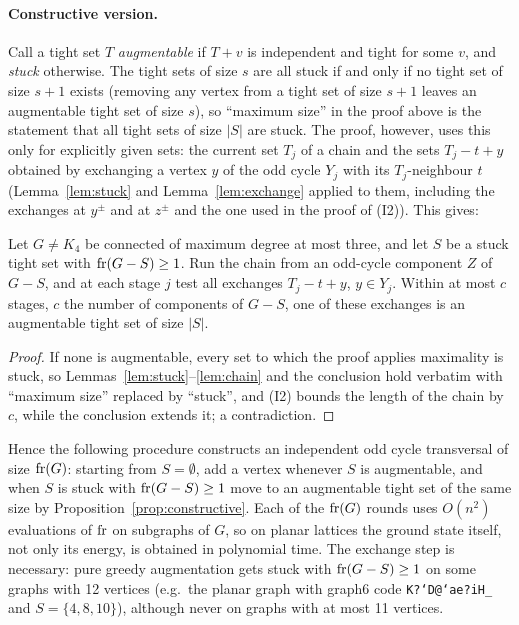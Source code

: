 \paragraph*{Constructive version.}
Call a tight set $T$ \emph{augmentable} if $T+v$ is independent and tight for some $v$, and
\emph{stuck} otherwise. The tight sets of size $s$ are all stuck if and only if no tight set of
size $s+1$ exists (removing any vertex from a tight set of size $s+1$ leaves an augmentable tight
set of size $s$), so ``maximum size'' in the proof above is the statement that all tight sets of
size $|S|$ are stuck. The proof, however, uses this only for explicitly given sets: the current
set $T_j$ of a chain and the sets $T_j-t+y$ obtained by exchanging a vertex $y$ of the odd cycle
$Y_j$ with its $T_j$-neighbour $t$ (Lemma~\ref{lem:stuck} and Lemma~\ref{lem:exchange} applied to
them, including the exchanges at $y^\pm$ and at $z^\pm$ and the one used in the proof of (I2)).
This gives:

\begin{proposition}\label{prop:constructive}
Let $G\ne K_4$ be connected of maximum degree at most three, and let $S$ be a stuck tight set
with $\operatorname{fr}(G-S)\ge1$. Run the chain from an odd-cycle component $Z$ of $G-S$, and at each stage $j$
test all exchanges $T_j-t+y$, $y\in Y_j$. Within at most $c$ stages, $c$ the number of components
of $G-S$, one of these exchanges is an augmentable tight set of size $|S|$.
\end{proposition}
\begin{proof}
If none is augmentable, every set to which the proof applies maximality is stuck, so
Lemmas~\ref{lem:stuck}--\ref{lem:chain} and the conclusion hold verbatim with ``maximum size''
replaced by ``stuck'', and (I2) bounds the length of the chain by $c$, while the conclusion
extends it; a contradiction.
\end{proof}

Hence the following procedure constructs an independent odd cycle transversal of size $\operatorname{fr}(G)$:
starting from $S=\emptyset$, add a vertex whenever $S$ is augmentable, and when $S$ is stuck with
$\operatorname{fr}(G-S)\ge1$ move to an augmentable tight set of the same size by
Proposition~\ref{prop:constructive}. Each of the $\operatorname{fr}(G)$ rounds uses $O(n^2)$ evaluations of
$\operatorname{fr}$ on subgraphs of $G$, so on planar lattices the ground state itself, not only its energy, is
obtained in polynomial time. The exchange step is necessary: pure greedy augmentation gets stuck
with $\operatorname{fr}(G-S)\ge1$ on some graphs with 12 vertices (e.g.\ the planar graph with graph6 code
\texttt{K?`D@`ae?iH\_} and $S=\{4,8,10\}$), although never on graphs with at most 11 vertices.

